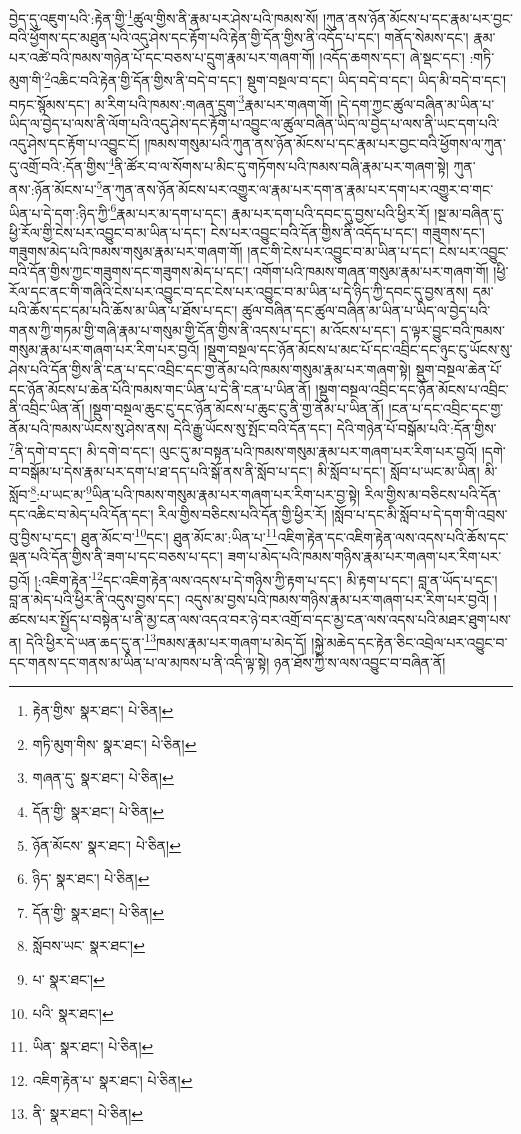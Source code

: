 བྱེད་དུ་འཇུག་པའི་:རྟེན་གྱི་\footnote{རྟེན་གྱིས་  སྣར་ཐང་།  པེ་ཅིན། }ཚུལ་གྱིས་ནི་རྣམ་པར་ཤེས་པའི་ཁམས་སོ། །ཀུན་ནས་ཉོན་མོངས་པ་དང་རྣམ་པར་བྱང་བའི་ཕྱོགས་དང་མཐུན་པའི་འདུ་ཤེས་དང་རྟོག་པའི་རྟེན་གྱི་དོན་གྱིས་ནི་འདོད་པ་དང་། གནོད་སེམས་དང་། རྣམ་པར་འཚེ་བའི་ཁམས་གཉེན་པོ་དང་བཅས་པ་དྲུག་རྣམ་པར་གཞག་གོ། །འདོད་ཆགས་དང་། ཞེ་སྡང་དང་། :གཏི་མུག་གི་\footnote{གཏི་མུག་གིས་  སྣར་ཐང་།  པེ་ཅིན། }འཆིང་བའི་རྟེན་གྱི་དོན་གྱིས་ནི་བདེ་བ་དང་། སྡུག་བསྔལ་བ་དང་། ཡིད་བདེ་བ་དང་། ཡིད་མི་བདེ་བ་དང་། བཏང་སྙོམས་དང་། མ་རིག་པའི་ཁམས་:གཞན་དྲུག་\footnote{གཞན་དུ་  སྣར་ཐང་།  པེ་ཅིན། }རྣམ་པར་གཞག་གོ། །དེ་དག་ཀྱང་ཚུལ་བཞིན་མ་ཡིན་པ་ཡིད་ལ་བྱེད་པ་ལས་ནི་ལོག་པའི་འདུ་ཤེས་དང་རྟོག་པ་འབྱུང་ལ་ཚུལ་བཞིན་ཡིད་ལ་བྱེད་པ་ལས་ནི་ཡང་དག་པའི་འདུ་ཤེས་དང་རྟོག་པ་འབྱུང་ངོ། །ཁམས་གསུམ་པའི་ཀུན་ནས་ཉོན་མོངས་པ་དང་རྣམ་པར་བྱང་བའི་ཕྱོགས་ལ་ཀུན་དུ་འགྲོ་བའི་:དོན་གྱིས་\footnote{དོན་གྱི་  སྣར་ཐང་།  པེ་ཅིན། }ནི་ཚོར་བ་ལ་སོགས་པ་མིང་དུ་གཏོགས་པའི་ཁམས་བཞི་རྣམ་པར་གཞག་སྟེ། ཀུན་ནས་:ཉོན་མོངས་པ་\footnote{ཉོན་མོངས་  སྣར་ཐང་།  པེ་ཅིན། }ན་ཀུན་ནས་ཉོན་མོངས་པར་འགྱུར་ལ་རྣམ་པར་དག་ན་རྣམ་པར་དག་པར་འགྱུར་བ་གང་ཡིན་པ་དེ་དག་:ཉིད་ཀྱི་\footnote{ཉིད་  སྣར་ཐང་།  པེ་ཅིན། }རྣམ་པར་མ་དག་པ་དང་། རྣམ་པར་དག་པའི་དབང་དུ་བྱས་པའི་ཕྱིར་རོ། །སྔ་མ་བཞིན་དུ་ཕྱི་རོལ་གྱི་ངེས་པར་འབྱུང་བ་མ་ཡིན་པ་དང་། ངེས་པར་འབྱུང་བའི་དོན་གྱིས་ནི་འདོད་པ་དང་། གཟུགས་དང་། གཟུགས་མེད་པའི་ཁམས་གསུམ་རྣམ་པར་གཞག་གོ། །ནང་གི་ངེས་པར་འབྱུང་བ་མ་ཡིན་པ་དང་། ངེས་པར་འབྱུང་བའི་དོན་གྱིས་ཀྱང་གཟུགས་དང་གཟུགས་མེད་པ་དང་། འགོག་པའི་ཁམས་གཞན་གསུམ་རྣམ་པར་གཞག་གོ། །ཕྱི་རོལ་དང་ནང་གི་གཞིའི་ངེས་པར་འབྱུང་བ་དང་ངེས་པར་འབྱུང་བ་མ་ཡིན་པ་དེ་ཉིད་ཀྱི་དབང་དུ་བྱས་ནས། དམ་པའི་ཆོས་དང་དམ་པའི་ཆོས་མ་ཡིན་པ་ཐོས་པ་དང་། ཚུལ་བཞིན་དང་ཚུལ་བཞིན་མ་ཡིན་པ་ཡིད་ལ་བྱེད་པའི་གནས་ཀྱི་གཏམ་གྱི་གཞི་རྣམ་པ་གསུམ་གྱི་དོན་གྱིས་ནི་འདས་པ་དང་། མ་འོངས་པ་དང་། ད་ལྟར་བྱུང་བའི་ཁམས་གསུམ་རྣམ་པར་གཞག་པར་རིག་པར་བྱའོ། །སྡུག་བསྔལ་དང་ཉོན་མོངས་པ་མང་པོ་དང་འབྲིང་དང་ཉུང་ངུ་ཡོངས་སུ་ཤེས་པའི་དོན་གྱིས་ནི་ངན་པ་དང་འབྲིང་དང་གྱ་ནོམ་པའི་ཁམས་གསུམ་རྣམ་པར་གཞག་སྟེ། སྡུག་བསྔལ་ཆེན་པོ་དང་ཉོན་མོངས་པ་ཆེན་པོའི་ཁམས་གང་ཡིན་པ་དེ་ནི་ངན་པ་ཡིན་ནོ། །སྡུག་བསྔལ་འབྲིང་དང་ཉོན་མོངས་པ་འབྲིང་ནི་འབྲིང་ཡིན་ནོ། །སྡུག་བསྔལ་ཆུང་ངུ་དང་ཉོན་མོངས་པ་ཆུང་ངུ་ནི་གྱ་ནོམ་པ་ཡིན་ནོ། །ངན་པ་དང་འབྲིང་དང་གྱ་ནོམ་པའི་ཁམས་ཡོངས་སུ་ཤེས་ནས། དེའི་རྒྱུ་ཡོངས་སུ་སྤོང་བའི་དོན་དང་། དེའི་གཉེན་པོ་བསྒོམ་པའི་:དོན་གྱིས་\footnote{དོན་གྱི་  སྣར་ཐང་།  པེ་ཅིན། }ནི་དགེ་བ་དང་། མི་དགེ་བ་དང་། ལུང་དུ་མ་བསྟན་པའི་ཁམས་གསུམ་རྣམ་པར་གཞག་པར་རིག་པར་བྱའོ། །དགེ་བ་བསྒོམ་པ་དེས་རྣམ་པར་དག་པ་ཐ་དད་པའི་སྒོ་ནས་ནི་སློབ་པ་དང་། མི་སློབ་པ་དང་། སློབ་པ་ཡང་མ་ཡིན། མི་སློབ་\footnote{སློབས་ཡང་  སྣར་ཐང་། }:པ་ཡང་མ་\footnote{པ་  སྣར་ཐང་། }ཡིན་པའི་ཁམས་གསུམ་རྣམ་པར་གཞག་པར་རིག་པར་བྱ་སྟེ། རིལ་གྱིས་མ་བཅིངས་པའི་དོན་དང་འཆིང་བ་མེད་པའི་དོན་དང་། རིལ་གྱིས་བཅིངས་པའི་དོན་གྱི་ཕྱིར་རོ། །སློབ་པ་དང་མི་སློབ་པ་དེ་དག་གི་འབྲས་བུ་བྱིས་པ་དང་། ཐུན་མོང་བ་\footnote{པའི་  སྣར་ཐང་། }དང་། ཐུན་མོང་མ་:ཡིན་པ་\footnote{ཡིན་  སྣར་ཐང་།  པེ་ཅིན། }འཇིག་རྟེན་དང་འཇིག་རྟེན་ལས་འདས་པའི་ཆོས་དང་ལྡན་པའི་དོན་གྱིས་ནི་ཟག་པ་དང་བཅས་པ་དང་། ཟག་པ་མེད་པའི་ཁམས་གཉིས་རྣམ་པར་གཞག་པར་རིག་པར་བྱའོ། །:འཇིག་རྟེན་\footnote{འཇིག་རྟེན་པ་  སྣར་ཐང་།  པེ་ཅིན། }དང་འཇིག་རྟེན་ལས་འདས་པ་དེ་གཉིས་ཀྱི་རྟག་པ་དང་། མི་རྟག་པ་དང་། བླ་ན་ཡོད་པ་དང་། བླ་ན་མེད་པའི་ཕྱིར་ནི་འདུས་བྱས་དང་། འདུས་མ་བྱས་པའི་ཁམས་གཉིས་རྣམ་པར་གཞག་པར་རིག་པར་བྱའོ། །ཚངས་པར་སྤྱོད་པ་བསྟེན་པ་ནི་མྱ་ངན་ལས་འདའ་བར་ཉེ་བར་འགྲོ་བ་དང་མྱ་ངན་ལས་འདས་པའི་མཐར་ཐུག་པས་ན། དེའི་ཕྱིར་དེ་ཡན་ཆད་དུ་ན་\footnote{ནི་  སྣར་ཐང་།  པེ་ཅིན། }ཁམས་རྣམ་པར་གཞག་པ་མེད་དོ། །སྐྱེ་མཆེད་དང་རྟེན་ཅིང་འབྲེལ་པར་འབྱུང་བ་དང་གནས་དང་གནས་མ་ཡིན་པ་ལ་མཁས་པ་ནི་འདི་ལྟ་སྟེ། ཉན་ཐོས་ཀྱི་ས་ལས་འབྱུང་བ་བཞིན་ནོ། 